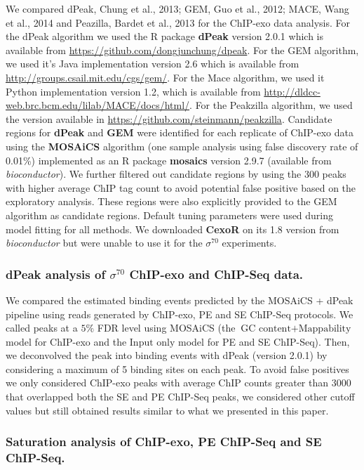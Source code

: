 \documentclass{bmcart}\usepackage[]{graphicx}\usepackage[]{color}
\newcommand{\sig}{\sigma^{70}}
\begin{document}
We compared dPeak, Chung et al., 2013; GEM, Guo et al., 2012; MACE,
Wang et al., 2014 and Peazilla, Bardet et al., 2013 for the ChIP-exo
data analysis. For the dPeak algorithm we used the R package
\textbf{dPeak} version 2.0.1 which is available from
\url{https://github.com/dongjunchung/dpeak}. For the GEM algorithm, we
used it's Java implementation version 2.6 which is available from
\url{http://groups.csail.mit.edu/cgs/gem/}. For the Mace algorithm, we
used it Python implementation version 1.2, which is available from
\url{http://dldcc-web.brc.bcm.edu/lilab/MACE/docs/html/}. For the
Peakzilla algorithm, we used the version available in
\url{https://github.com/steinmann/peakzilla}. Candidate regions for
\textbf{dPeak} and \textbf{GEM} were identified for each replicate of
ChIP-exo data using the \textbf{MOSAiCS} algorithm \cite{mosaics} (one
sample analysis using false discovery rate of 0.01\%)
implemented as an R package \textbf{mosaics} version 2.9.7 (available
from \emph{bioconductor}). We further filtered out candidate regions
by using the 300 peaks with higher average ChIP tag count to
avoid potential false positive based on the exploratory
analysis. These regions were also explicitly provided to the GEM
algorithm as candidate regions. Default tuning parameters were used
during model fitting for all methods. We downloaded \textbf{CexoR}
\cite{cexor} on its 1.8 version from \emph{bioconductor} but were
unable to use it for the $\sig$ experiments.

\subsubsection*{dPeak analysis of $\sig$ ChIP-exo and ChIP-Seq data.}

We compared the estimated binding events predicted by the MOSAiCS +
dPeak pipeline using reads generated by ChIP-exo, PE and SE ChIP-Seq
protocols. We called peaks at a $5\%$ FDR level using MOSAiCS (the
$\mbox{GC content} + \mbox{Mappability}$ model for ChIP-exo and the
$\mbox{Input only}$ model for PE and SE ChIP-Seq). Then, we
deconvolved the peak into binding events with dPeak (version 2.0.1) by
considering a maximum of 5 binding sites on each peak. To avoid false
positives we only considered ChIP-exo peaks with average ChIP counts
greater than 3000 that overlapped both the SE and PE ChIP-Seq peaks,
we considered other cutoff values but still obtained results similar
to what we presented in this paper.

\subsubsection*{Saturation analysis of ChIP-exo, PE ChIP-Seq and SE ChIP-Seq.}
\end{document}
